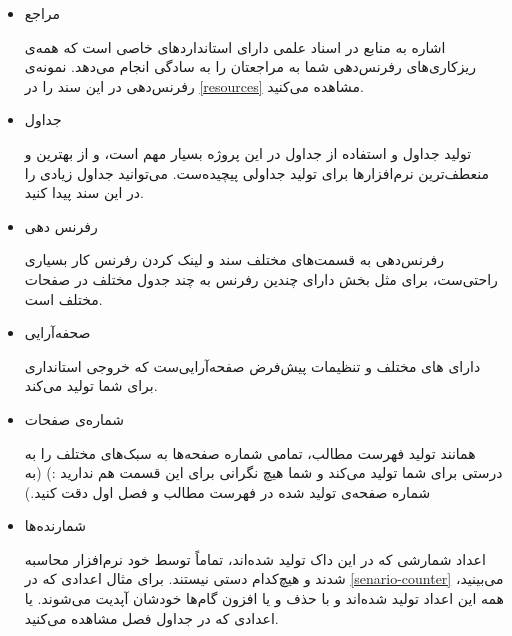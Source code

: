 \begin{itemize}
\begin{itemize}
		قسمتی از  سند که برای تولید فهرست مطالب استفاده شده است:
		
\begin{latin}
		\begin{lstlisting}
...
identifierstyle=\color{black}
}
% --------------------------------------------------



\frontmatter
\tableofcontents
\mainmatter


...
		\end{lstlisting}
	\end{latin}
می‌بینید که فقط یک دستور \texttt{tableofcontents} هست که تمام فهرست مطالب این سند را تولید کرده است.

  		\item مراجع
  		
  		اشاره به منابع در اسناد علمی دارای استاندارد‌های خاصی است که همه‌‌ی ریزکاری‌های رفرنس‌دهی شما به مراجعتان را \lr{\LaTeX } به سادگی انجام می‌دهد. نمونه‌ی رفرنس‌دهی در این سند را در \ref{resources} مشاهده می‌کنید.
  		
		\item جداول
		
		تولید جداول و استفاده از جداول در این پروژه بسیار مهم است، و \lr{\LaTeX } از بهترین و منعطف‌ترین نرم‌افزار‌ها برای تولید جداولی پیچیده‌ست. می‌توانید جداول زیادی را در این سند پیدا کنید.
		
		\item رفرنس دهی
		
		رفرنس‌دهی به قسمت‌های مختلف سند و لینک کردن رفرنس کار بسیاری راحتی‌ست، برای مثل بخش  دارای چندین رفرنس به چند جدول مختلف در صفحات مختلف است.
		
		\item صحفه‌‌آرایی

\lr{\LaTeX }
دارای ‌های مختلف و تنظیمات پیش‌فرض صفحه‌‌آرایی‌ست که خروجی استانداری برای شما تولید می‌کند.
		\item شماره‌ی صفحات
	
		همانند تولید فهرست مطالب، \lr{\LaTeX } تمامی شماره صفحه‌ها به سبک‌های مختلف را به درستی برای شما تولید می‌کند و شما هیچ نگرانی برای این قسمت هم ندارید :)
		(به شماره‌ صفحه‌ی تولید شده در فهرست مطالب و فصل اول دقت کنید.)
		
  		\item شمارنده‌ها
  		
  		 اعداد شمارشی که در این داک تولید شده‌اند، تماماً توسط خود نرم‌افزار محاسبه شدند و هیچ‌کدام دستی نیستند. برای مثال اعدادی که در
  		 \ref{senario-counter} می‌بینید، همه‌ این اعداد  تولید شده‌اند و با حذف و یا افزون گام‌ها خودشان آپدیت می‌شوند. یا اعدادی که در جداول فصل  مشاهده می‌کنید.
  		   		
  	\end{itemize}
  \end{itemize}
  
